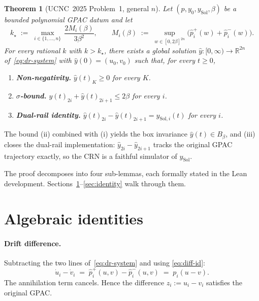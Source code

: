 \documentclass[11pt]{article}
\newtheorem{theorem}{Theorem}
\newcommand{\R}{\mathbb{R}}
\begin{document}
\begin{theorem}[UCNC~2025 Problem~1, general $n$]\label{thm:main}
Let $(p, y_0, y_{\mathrm{Sol}}, \beta)$ be a bounded polynomial GPAC
datum and let
\[
  k_\star \;:=\; \max_{i \in \{1,\dots,n\}}\,
                 \frac{2 M_i(\beta)}{3 \beta^2},
  \qquad
  M_i(\beta) \;:=\; \sup_{w \in [0, 2\beta]^{2n}}
                    \bigl(\widehat{p}_i^{+}(w) + \widehat{p}_i^{-}(w)\bigr).
\]
For every rational $k$ with $k > k_\star$, there exists a global
solution $\widehat y\colon [0, \infty) \to \R^{2n}$ of~\eqref{eq:dr-system}
with $\widehat y(0) = (u_0, v_0)$ such that, for every $t \ge 0$,
\begin{enumerate}
\item[\textup{(i)}]\textbf{Non-negativity.}
$\widehat y(t)_K \ge 0$ for every $K$.
\item[\textup{(ii)}]\textbf{$\sigma$-bound.}
$\widehat y(t)_{2i} + \widehat y(t)_{2i+1} \le 2\beta$ for every $i$.
\item[\textup{(iii)}]\textbf{Dual-rail identity.}
$\widehat y(t)_{2i} - \widehat y(t)_{2i+1} = y_{\mathrm{Sol}, i}(t)$
for every $i$.
\end{enumerate}
\end{theorem}

The bound (ii) combined with (i) yields the box invariance
$\widehat y(t) \in B_\beta$, and (iii) closes the dual-rail
implementation: $\widehat y_{2i} - \widehat y_{2i+1}$ tracks the
original GPAC trajectory exactly, so the CRN is a faithful simulator of
$y_{\mathrm{Sol}}$.

The proof decomposes into four sub-lemmas, each formally stated in the
Lean development.  Sections~\ref{sec:identities}--\ref{sec:identity}
walk through them.

\section{Algebraic identities}\label{sec:identities}

\paragraph{Drift difference.}
Subtracting the two lines of~\eqref{eq:dr-system} and using
\eqref{eq:diff-id}:
\begin{equation}\label{eq:drift-diff}
  \dot u_i - \dot v_i
    \;=\; \widehat{p}_i^{+}(u,v) - \widehat{p}_i^{-}(u,v)
    \;=\; p_i(u - v).
\end{equation}
The annihilation term cancels.  Hence the difference $z_i := u_i - v_i$
satisfies the original GPAC.
\end{document}
